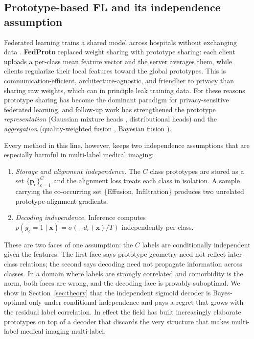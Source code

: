\documentclass[11pt,a4paper]{article}
\theoremstyle{definition}
\begin{document}
\subsection{Prototype-based FL and its independence assumption}

Federated learning trains a shared model across hospitals without exchanging data \citep{mcmahan2017fedavg}. \textbf{FedProto} \citep{tan2022fedproto} replaced weight sharing with prototype sharing: each client uploads a per-class mean feature vector and the server averages them, while clients regularize their local features toward the global prototypes. This is communication-efficient, architecture-agnostic, and friendlier to privacy than sharing raw weights, which can in principle leak training data. For these reasons prototype sharing has become the dominant paradigm for privacy-sensitive federated learning, and follow-up work has strengthened the prototype \emph{representation} (Gaussian mixture heads \citep{zhang2024fedgmkd}, distributional heads) and the \emph{aggregation} (quality-weighted fusion \citep{zhang2024fedgmkd}, Bayesian fusion \citep{chen2021fedbe}).

Every method in this line, however, keeps two independence assumptions that are especially harmful in multi-label medical imaging:
\begin{enumerate}[leftmargin=*,itemsep=2pt]
  \item \emph{Storage and alignment independence.} The $C$ class prototypes are stored as a set $\{\mathbf{p}_c\}_{c=1}^{C}$ and the alignment loss treats each class in isolation. A sample carrying the co-occurring set \{Effusion, Infiltration\} produces two unrelated prototype-alignment gradients.
  \item \emph{Decoding independence.} Inference computes $p(y_c{=}1\mid \mathbf{x})=\sigma(-d_c(\mathbf{x})/T)$ independently per class.
\end{enumerate}
These are two faces of one assumption: the $C$ labels are conditionally independent given the features. The first face says prototype geometry need not reflect inter-class relations; the second says decoding need not propagate information across classes. In a domain where labels are strongly correlated and comorbidity is the norm, both faces are wrong, and the decoding face is provably suboptimal. We show in Section~\ref{sec:theory} that the independent sigmoid decoder is Bayes-optimal only under conditional independence and pays a regret that grows with the residual label correlation. In effect the field has built increasingly elaborate prototypes on top of a decoder that discards the very structure that makes multi-label medical imaging multi-label.
\end{document}

